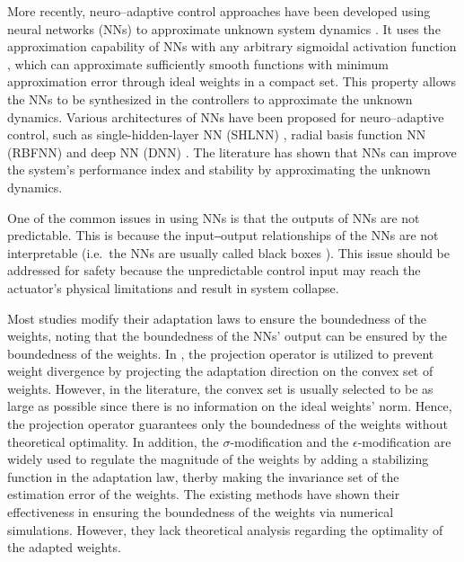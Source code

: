 \documentclass[letterpaper, 10 pt, conference]{ieeeconf}  %
\newcommand\ie{\textrm{i.e.\ }}
\begin{document}
More recently, neuro–adaptive control approaches have been developed using neural networks (NNs) to approximate unknown system dynamics \cite{RN24}.
It uses the approximation capability of NNs with any arbitrary sigmoidal activation function \cite{RN35}, which can approximate sufficiently smooth functions with minimum approximation error through ideal weights in a compact set.
This property allows the NNs to be synthesized in the controllers to approximate the unknown dynamics.
Various architectures of NNs have been proposed for neuro–adaptive control, such as single-hidden-layer NN (SHLNN) \cite{RN16, RN18}, radial basis function NN (RBFNN) \cite{RN17, RN31} and deep NN (DNN) \cite{RN36}.
The literature has shown that NNs can improve the system's performance index and stability by approximating the unknown dynamics.


One of the common issues in using NNs is that the outputs of NNs are not predictable.
This is because the input‒output relationships of the NNs are not interpretable (\ie the NNs are usually called black boxes \cite{RN8, RN9}).
This issue should be addressed for safety because the unpredictable control input may reach the actuator's physical limitations and result in system collapse.

Most studies modify their adaptation laws to ensure the boundedness of the weights, noting that the boundedness of the NNs' output can be ensured by the boundedness of the weights.
In \cite{RN31, RN36}, the projection operator is utilized to prevent weight divergence by projecting the adaptation direction on the convex set of weights.
However, in the literature, the convex set is usually selected to be as large as possible since there is no information on the ideal weights' norm.
Hence, the projection operator guarantees only the boundedness of the weights without theoretical optimality.
In addition, the $\sigma$-modification \cite{RN17} and the $\epsilon$-modification \cite{RN16, RN18} are widely used to regulate the magnitude of the weights by adding a stabilizing function in the adaptation law, therby making the invariance set of the estimation error of the weights. 
The existing methods have shown their effectiveness in ensuring the boundedness of the weights via numerical simulations.
However, they lack theoretical analysis regarding the optimality of the adapted weights.
\end{document}
